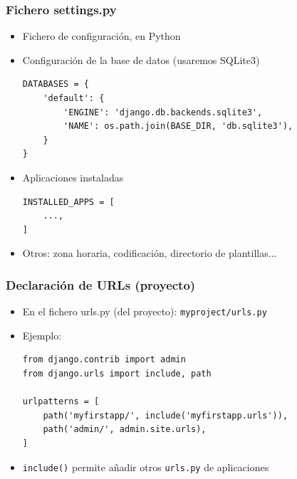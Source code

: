 \begin{frame}[fragile]
\frametitle{Fichero settings.py}

\begin{itemize}
\item Fichero de configuración, en Python
\item Configuración de la base de datos (usaremos SQLite3)
\begin{verbatim}
DATABASES = {
    'default': {
        'ENGINE': 'django.db.backends.sqlite3',
        'NAME': os.path.join(BASE_DIR, 'db.sqlite3'),
    }
}
\end{verbatim}
\item Aplicaciones instaladas
\begin{verbatim}
INSTALLED_APPS = [
    ...,
]
\end{verbatim}
\item Otros: zona horaria, codificación, directorio de plantillas...
\end{itemize}

\end{frame}


\begin{frame}[fragile]
\frametitle{Declaración de URLs (proyecto)}

\begin{itemize}
\item En el fichero urls.py (del proyecto): \verb|myproject/urls.py|
\item Ejemplo:

\begin{verbatim}
from django.contrib import admin
from django.urls import include, path

urlpatterns = [
    path('myfirstapp/', include('myfirstapp.urls')),
    path('admin/', admin.site.urls),
]
\end{verbatim}


\item \verb|include()| permite añadir otros \verb|urls.py| de aplicaciones

\end{itemize}



\end{frame}



